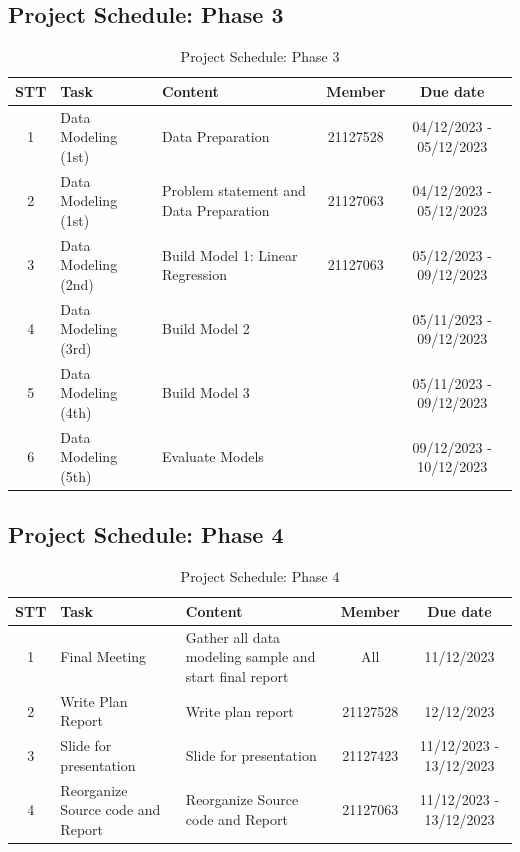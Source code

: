 \documentclass[13pt]{article}
\begin{document}
\subsection{Project Schedule: Phase 3}
\begin{table}[H]
    \centering
    \begin{tabular}{|c|p{4cm}|p{5cm}|c|c|}
    \hline
       \textbf{STT} & \textbf{Task} & \textbf{Content} & \textbf{Member} & \textbf{Due date}\\
    \hline
        1 & Data Modeling (1st) & Data Preparation & 21127528 & 04/12/2023 - 05/12/2023\\
    \hline
        2 & Data Modeling (1st) & Problem statement and Data Preparation & 21127063 & 04/12/2023 - 05/12/2023\\
    \hline
        3 & Data Modeling (2nd) & Build Model 1: Linear Regression & 21127063 & 05/12/2023 - 09/12/2023\\
    \hline
        4 & Data Modeling (3rd) & Build Model 2 &  & 05/11/2023 - 09/12/2023\\
    \hline
        5 & Data Modeling (4th) & Build Model 3 &  & 05/11/2023 - 09/12/2023\\
    \hline
        6 & Data Modeling (5th) & Evaluate Models &  & 09/12/2023 - 10/12/2023\\
    \hline
    \end{tabular}
    \caption{Project Schedule: Phase 3}
    \label{tab:mytable}
\end{table}


\subsection{Project Schedule: Phase 4}
\begin{table}[h]
    \centering
    \begin{tabular}{|c|p{4cm}|p{5cm}|c|c|}
    \hline
       \textbf{STT} & \textbf{Task} & \textbf{Content} & \textbf{Member} & \textbf{Due date}\\
    \hline
        1 & Final Meeting & Gather all data modeling sample and start final report & All & 11/12/2023\\
    \hline
        2 & Write Plan Report & Write plan report & 21127528 & 12/12/2023\\
    \hline
        3 & Slide for presentation & Slide for presentation & 21127423 & 11/12/2023 - 13/12/2023\\
    \hline
        4 & Reorganize Source code and Report & Reorganize Source code and Report & 21127063 & 11/12/2023 - 13/12/2023\\
    \hline
    \end{tabular}
    \caption{Project Schedule: Phase 4}
    \label{tab:mytable}
\end{table}
\end{document}
